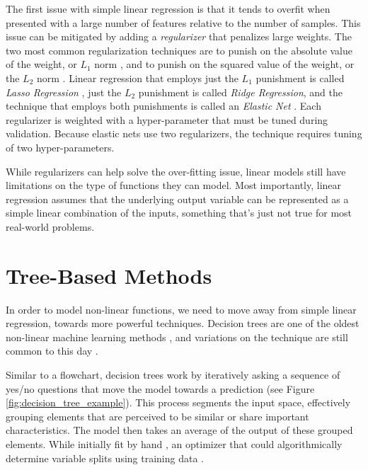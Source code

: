 The first issue with simple linear regression is that it tends to overfit when presented with a large number of features relative to the number of samples. This issue can be mitigated by adding a \textit{regularizer} that penalizes large weights. The two most common regularization techniques are to punish on the absolute value of the weight, or $L_1$ norm \citep{Santosa1986LinearSeismograms}, and to punish on the  squared value of the weight, or the $L_2$ norm \citep{Tikhonov1977SolutionsProblems}. Linear regression that employs just the $L_1$ punishment is called \textit{Lasso Regression} \citep{Tibshirani1994RegressionLasso}, just the $L_2$ punishment is called \textit{Ridge Regression}, and the technique that employs both punishments is called an \textit{Elastic Net} \citep{Zou2005RegularizationNet}. Each regularizer is weighted with a hyper-parameter that must be tuned during validation. Because elastic nets use two regularizers, the technique requires tuning of two hyper-parameters. 

While regularizers can help solve the over-fitting issue, linear models still have limitations on the type of functions they can model. Most importantly, linear regression assumes that the underlying output variable can be represented as a simple linear combination of the inputs, something that’s just not true for most real-world problems. 

\section{Tree-Based Methods}

In order to model non-linear functions, we need to move away from simple linear regression, towards more powerful techniques. Decision trees are one of the oldest non-linear machine learning methods \citep{Breiman1984ClassificationTrees}, and variations on the technique are still common to this day \citep{Natekin2013GradientTutorial}. 

Similar to a flowchart, decision trees work by iteratively asking a sequence of yes/no questions that move the model towards a prediction (see Figure \ref{fig:decision_tree_example}). This process segments the input space, effectively grouping elements that are perceived to be similar or share important characteristics. The model then takes an average of the output of these grouped elements. While initially fit by hand \citep{Chisholm1968TheHumidity},  an optimizer that could algorithmically determine variable splits using training data \citep{Breiman1984ClassificationTrees}.

